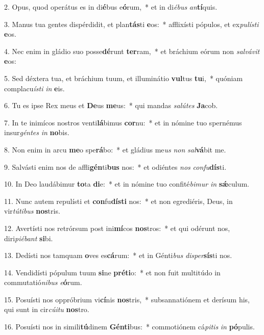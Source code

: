 2. Opus, quod operátus es in di\textbf{é}bus e\textbf{ó}rum,~*  et in di\textit{é}\textit{bus} \textit{an}\textbf{tí}quis.\

3. Manus tua gentes dispérdidit, et plan\textbf{tás}ti \textbf{e}os:~*  afflixísti pópulos, et ex\textit{pu}\textit{lís}\textit{ti} \textbf{e}os.\

4. Nec enim in gládio suo posse\textbf{dé}runt \textbf{ter}ram,~*  et bráchium eórum non \textit{sal}\textit{vá}\textit{vit} \textbf{e}os:\

5. Sed déxtera tua, et bráchium tuum, et illuminátio \textbf{vul}tus \textbf{tu}i,~*  quóniam complacu\textit{ís}\textit{ti} \textit{in} \textbf{e}is.\

6. Tu es ipse Rex meus et \textbf{De}us \textbf{me}us:~*  qui mandas \textit{sa}\textit{lú}\textit{tes} \textbf{Ja}cob.\

7. In te inimícos nostros venti\textbf{lá}bimus \textbf{cor}nu:~*  et in nómine tuo spernémus insur\textit{gén}\textit{tes} \textit{in} \textbf{no}bis.\

8. Non enim in arcu \textbf{me}o spe\textbf{rá}bo:~*  et gládius me\textit{us} \textit{non} \textit{sal}\textbf{vá}bit me.\

9. Salvásti enim nos de affli\textbf{gén}ti\textbf{bus} nos:~*  et odiéntes \textit{nos} \textit{con}\textit{fu}\textbf{dís}ti.\

10. In Deo laudábimur \textbf{to}ta \textbf{di}e:~*  et in nómine tuo confité\textit{bi}\textit{mur} \textit{in} \textbf{sǽ}culum.\

11. Nunc autem repulísti et \textbf{con}fu\textbf{dís}\textbf{ti} nos:~*  et non egrediéris, Deus, in vir\textit{tú}\textit{ti}\textit{bus} \textbf{nos}tris.\

12. Avertísti nos retrórsum post ini\textbf{mí}cos \textbf{nos}tros:~*  et qui odérunt nos, diri\textit{pi}\textit{é}\textit{bant} \textbf{si}bi.\

13. Dedísti nos tamquam \textbf{o}ves es\textbf{cá}rum:~*  et in Génti\textit{bus} \textit{di}\textit{sper}\textbf{sís}ti nos.\

14. Vendidísti pópulum tuum \textbf{si}ne \textbf{pré}\textbf{ti}o:~*  et non fuit multitúdo in commutatió\textit{ni}\textit{bus} \textit{e}\textbf{ó}rum.\

15. Posuísti nos oppróbrium vi\textbf{cí}nis \textbf{nos}tris,~*  subsannatiónem et derísum his, qui sunt in cir\textit{cú}\textit{i}\textit{tu} \textbf{nos}tro.\

16. Posuísti nos in simili\textbf{tú}dinem \textbf{Gén}\textbf{ti}bus:~*  commotiónem cá\textit{pi}\textit{tis} \textit{in} \textbf{pó}pulis.\

